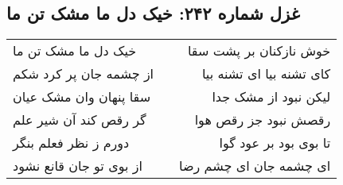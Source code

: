 \begin{center}
\section*{غزل شماره ۲۴۲: خیک دل ما مشک تن ما}
\label{sec:0242}
\begin{longtable}{l p{0.5cm} r}
خیک دل ما مشک تن ما
&&
خوش نازکنان بر پشت سقا
\\
از چشمه جان پر کرد شکم
&&
کای تشنه بیا ای تشنه بیا
\\
سقا پنهان وان مشک عیان
&&
لیکن نبود از مشک جدا
\\
گر رقص کند آن شیر علم
&&
رقصش نبود جز رقص هوا
\\
دورم ز نظر فعلم بنگر
&&
تا بوی بود بر عود گوا
\\
از بوی تو جان قانع نشود
&&
ای چشمه جان ای چشم رضا
\\
\end{longtable}
\end{center}
